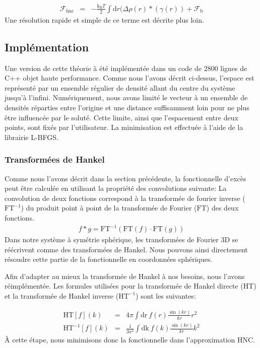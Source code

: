 \begin{eqnarray}
\mathcal{F}_\mathrm{hnc} &=& -\frac{\mathrm{k_B}T}{2} \int \mathrm{d} r (\Delta\rho\left(r \right)  \ast (\gamma(r)) + \mathcal{F}_\mathrm{b}
\end{eqnarray}
Une résolution rapide et simple de ce terme est décrite plus loin.




\subsection{Implémentation}
Une version de cette théorie à été implémentée dans un code de 2800 lignes de C++ objet haute performance. Comme nous l'avons décrit ci-dessus, l'espace est représenté par un ensemble régulier de densité allant du centre du système jusqu'à l'infini. Numériquement, nous avons limité le vecteur à un ensemble de densités réparties entre l'origine et une distance suffisamment loin pour ne plus être influencée par le soluté. Cette limite, ainsi que l'espacement entre deux points, sont fixés par l'utilisateur.
La minimisation est effectuée à l'aide de la librairie L-BFGS\cite{zhu_algorithm_1997}.

\subsubsection{Transformées de Hankel}
Comme nous l'avons décrit dans la section précédente, la fonctionnelle d'excès peut être calculée en utilisant la propriété des convolutions suivante: La convolution de deux fonctions correspond à la transformée de fourier inverse ($\mathrm{FT}^{-1}$) du produit point à point de la transformée de Fourier ($\mathrm{FT}$) des deux fonctions.
\begin{eqnarray}
f \ast g  = \mathrm{FT}^{-1}(\mathrm{FT}(f)\cdot\mathrm{FT}(g))
\end{eqnarray}
Dans notre système à symétrie sphérique, les transformées de Fourier 3D se réécrivent comme des transformées de Hankel. Nous pouvons ainsi directement résoudre cette partie de la fonctionnelle en coordonnées sphériques.



Afin d'adapter au mieux la transformée de Hankel à nos besoins, nous l'avons réimplémentée. Les formules utilisées pour la transformée de Hankel directe (HT) et la transformée de Hankel inverse ($\mathrm{HT}^{-1}$) sont les suivantes:


\begin{eqnarray}
\mathrm{HT}[f](k) &=& 4\pi\int \mathrm{dr}\ f(r)\frac{\sin(kr)}{kr}r^2\\
\mathrm{HT}^{-1}[f](k) &=& \frac{1}{3\pi^2}\int \mathrm{dk}\ f(k)\frac{\sin(kr)}{kr}k^2
\end{eqnarray}
À cette étape, nous minimisons donc la fonctionnelle dans l'approximation HNC.  



